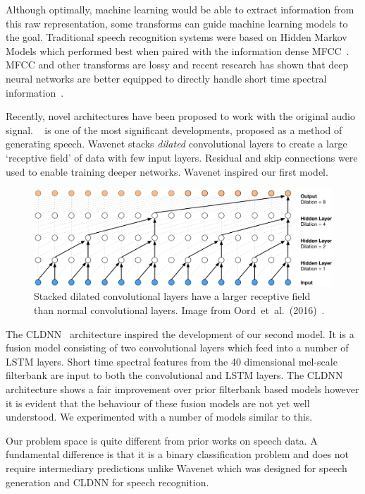 \documentclass[12pt, twoside]{book}
\renewcommand\emph[1]{\textit{\color{USred}{#1}}}
\begin{document}
Although optimally, machine learning would be able to extract information from this raw representation, some transforms can guide machine learning models to the goal. Traditional speech recognition systems were based on Hidden Markov Models which performed best when paired with the information dense MFCC~\cite{hinton2012speech}. MFCC and other transforms are lossy and recent research has shown that deep neural networks are better equipped to directly handle short time spectral information~\cite{microsoftspeech}. 

Recently, novel architectures have been proposed to work with the original audio signal. \emph{Wavenet}~\cite{wavenet} is one of the most significant developments, proposed as a method of generating speech. Wavenet stacks \textit{dilated} convolutional layers to create a large `receptive field' of data with few input layers. Residual and skip connections were used to enable training deeper networks. Wavenet inspired our first model.


\begin{figure}[h]
	\label{wavenet}
	\centering\centerline{\includegraphics[width=1\linewidth]{wavenet.png}}
	\caption{Stacked dilated convolutional layers have a larger receptive field than normal convolutional layers. Image from Oord~et~al.~(2016)~\cite{wavenet}.}
\end{figure}


The CLDNN~\cite{convlstm} architecture inspired the development of our second model. It is a fusion model consisting of two convolutional layers which feed into a number of LSTM layers. Short time spectral features from the 40 dimensional mel-scale filterbank are input to both the convolutional and LSTM layers. The CLDNN architecture shows a fair improvement over prior filterbank based models however it is evident that the behaviour of these fusion models are not yet well understood. We experimented with a number of models similar to this.

Our problem space is quite different from prior works on speech data. A fundamental difference is that it is a binary classification problem and does not require intermediary predictions unlike Wavenet which was designed for speech generation and CLDNN for speech recognition.
\end{document}
